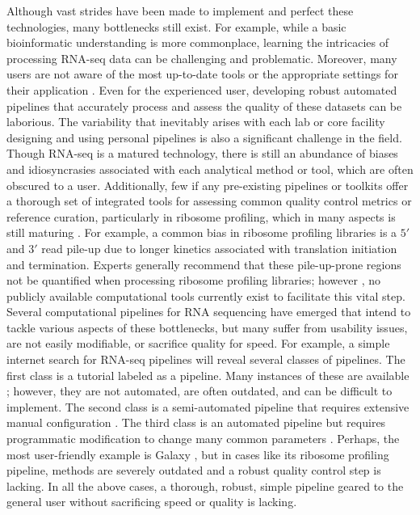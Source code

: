 \documentclass[10pt, oneside]{article}
\begin{document}
Although vast strides have been made to implement and perfect these technologies, many bottlenecks still exist. For example, while a basic bioinformatic understanding is more commonplace, learning the intricacies of processing RNA-seq data can be challenging and problematic. Moreover, many users are not aware of the most up-to-date tools or the appropriate settings for their application \cite{costello_npjsba, funari_science}. Even for the experienced user, developing robust automated pipelines that accurately process and assess the quality of these datasets can be laborious. The variability that inevitably arises with each lab or core facility designing and using personal pipelines is also a significant challenge in the field. \\

Though RNA-seq is a matured technology, there is still an abundance of biases and idiosyncrasies associated with each analytical method or tool, which are often obscured to a user. Additionally, few if any pre-existing pipelines or toolkits offer a thorough set of integrated tools for assessing common quality control metrics or reference curation, particularly in ribosome profiling, which in many aspects is still maturing \cite{ingolia_meth}. For example, a common bias in ribosome profiling libraries is a $5'$ and $3'$ read pile-up \cite{gerashchenko_nar, artieri_gr, hussman_plosg} due to longer kinetics associated with translation initiation and termination. Experts generally recommend that these pile-up-prone regions not be quantified when processing ribosome profiling libraries; however \cite{ingolia_meth, weinberg_reports}, no publicly available computational tools currently exist to facilitate this vital step. \\

Several computational pipelines for RNA sequencing have emerged that intend to tackle various aspects of these bottlenecks, but many suffer from usability issues, are not easily modifiable, or sacrifice quality for speed. For example, a simple internet search for RNA-seq pipelines will reveal several classes of pipelines. The first class is a tutorial labeled as a pipeline. Many instances of these are available \cite{encode_pipeline, gdc_pipeline}; however, they are not automated, are often outdated, and can be difficult to implement. The second class is a semi-automated pipeline that requires extensive manual configuration \cite{pavlidis_pipeline, nfcore_pipeline, umcu_pipeline, cellgeni_pipeline}. The third class is an automated pipeline but requires programmatic modification to change many common parameters \cite{dnanexus_pipeline, nextflow_pipeline}. Perhaps, the most user-friendly example is Galaxy \cite{galaxy}, but in cases like its ribosome profiling pipeline, methods are severely outdated and a robust quality control step is lacking. In all the above cases, a thorough, robust, simple pipeline geared to the general user without sacrificing speed or quality is lacking. \\
\end{document}
